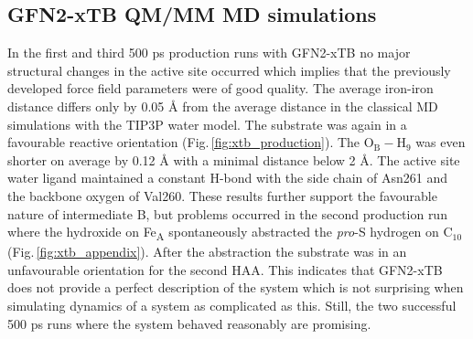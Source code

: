 \subsection{GFN2-xTB QM/MM MD simulations}
In the first and third 500 ps production runs with GFN2-xTB no major structural changes in the active site occurred which implies that the previously developed force field parameters were of good quality. The average iron-iron distance differs only by 0.05 Å from the average distance in the classical MD simulations with the TIP3P water model. The substrate was again in a favourable reactive orientation (Fig.\,\ref{fig:xtb_production}). The O$_{\text{B}}-$H$_{\text{9}}$ was even shorter on average by 0.12 Å with a minimal distance below 2 Å. The active site water ligand maintained a constant H-bond with the side chain of Asn261 and the backbone oxygen of Val260. These results further support the favourable nature of intermediate B, but problems occurred in the second production run where the hydroxide on Fe\textsubscript{A} spontaneously abstracted the \textit{pro}-S hydrogen on C$_{10}$ (Fig.\,\ref{fig:xtb_appendix}). After the abstraction the substrate was in an unfavourable orientation for the second HAA. This indicates that GFN2-xTB does not provide a perfect description of the system which is not surprising when simulating dynamics of a system as complicated as this. Still, the two successful 500 ps runs where the system behaved reasonably are promising.
